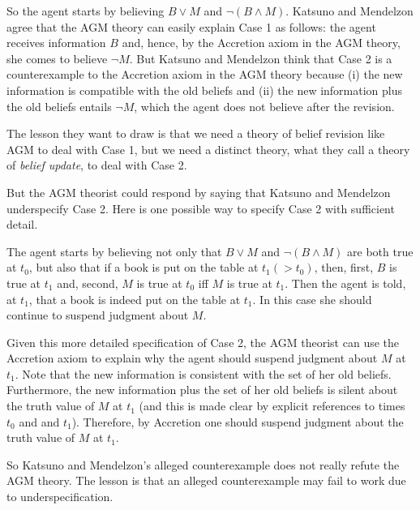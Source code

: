 \ed So the agent starts by believing $B \vee M$ and $\neg(B \wedge M)$. Katsuno and Mendelzon agree that the AGM theory can easily explain Case 1 as follows: the agent receives information $B$ and, hence, by the Accretion axiom in the AGM theory, she comes to believe $\neg M$. But Katsuno and Mendelzon think that Case 2 is a counterexample to the Accretion axiom in the AGM theory because (i) the new information is compatible with the old beliefs and (ii) the new information plus the old beliefs entails $\neg M$, which the agent does not believe after the revision.

The lesson they want to draw is that we need a theory of belief revision like AGM to deal with Case 1, but we need a distinct theory, what they call a theory of {\em belief update}, to deal with Case 2. 

But the AGM theorist could respond by saying that Katsuno and Mendelzon underspecify Case 2. Here is one possible way to specify Case 2 with sufficient detail. \op

	 The agent starts by believing not only that $B \vee M$ and $\neg(B \wedge M)$ are both true at $t_0$, but also that if a book is put on the table at $t_1 (> t_0)$, then, first, $B$ is true at $t_1$ and, second, $M$ is true at $t_0$ iff $M$ is true at $t_1$. Then the agent is told, at $t_1$, that a book is indeed put on the table at $t_1$. In this case she should continue to suspend judgment about $M$. 

\ed Given this more detailed specification of Case 2, the AGM theorist can use the Accretion axiom to explain why the agent should suspend judgment about $M$ at $t_1$. Note that the new information is consistent with the set of her old beliefs. Furthermore, the new information plus the set of her old beliefs is silent about the truth value of $M$ at $t_1$ (and this is made clear by explicit references to times $t_0$ and and $t_1$). Therefore, by Accretion one should suspend judgment about the truth value of $M$ at $t_1$. 

So Katsuno and Mendelzon's alleged counterexample does not really refute the AGM theory. The lesson is that an alleged counterexample may fail to work due to underspecification. 

